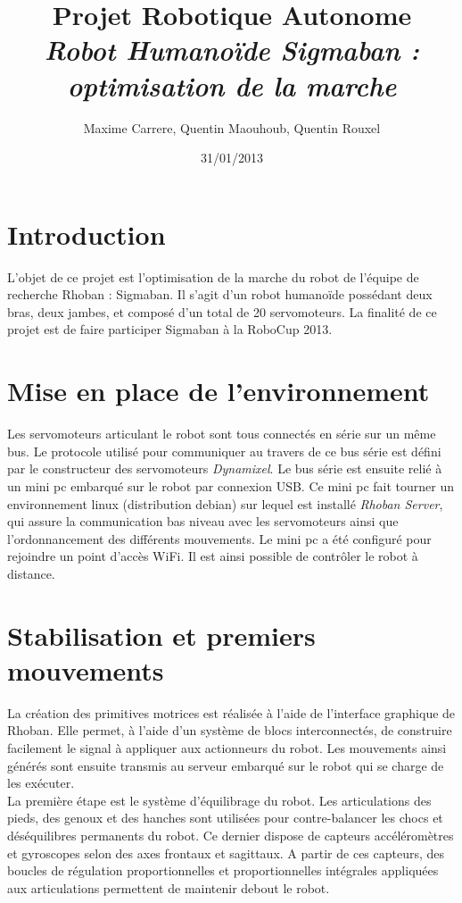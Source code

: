 \documentclass[11pt]{article}
\title{Projet Robotique Autonome\\
\textit{Robot Humanoïde Sigmaban : optimisation de la marche}}
\author{Maxime Carrere, Quentin Maouhoub, Quentin Rouxel}
\date{31/01/2013}
\begin{document}
\maketitle

\section{Introduction}

L'objet de ce projet est l'optimisation de la marche du robot de l'équipe 
de recherche Rhoban : Sigmaban. Il s'agit d'un robot humanoïde possédant deux bras,
deux jambes, et composé d'un total de 20 servomoteurs. La finalité de ce projet est de faire
participer Sigmaban à la RoboCup 2013.

\section{Mise en place de l'environnement}

Les servomoteurs articulant le robot sont tous connectés en série sur un même 
bus. Le protocole utilisé pour communiquer au travers de ce bus série est défini par le
constructeur des servomoteurs \textit{Dynamixel}. Le bus série est ensuite relié à un mini pc
embarqué sur le robot par connexion USB. Ce mini pc fait tourner un environnement linux
(distribution debian) sur lequel est installé \textit{Rhoban Server}, qui assure la communication
bas niveau avec les servomoteurs ainsi que l'ordonnancement des différents mouvements. Le mini pc
a été configuré pour rejoindre un point d'accès WiFi. Il est ainsi possible de contrôler le robot
à distance.

\section{Stabilisation et premiers mouvements}

La création des primitives motrices est réalisée à l'aide de l'interface graphique de Rhoban.
Elle permet, à l'aide d'un système de blocs interconnectés,
de construire facilement le signal à appliquer aux actionneurs du robot. Les mouvements ainsi générés
sont ensuite transmis au serveur embarqué sur le robot qui se charge de les exécuter.\\

La première étape est le système d'équilibrage du robot. Les articulations des pieds, des genoux 
et des hanches sont utilisées pour contre-balancer les chocs et déséquilibres permanents
du robot. Ce dernier dispose de capteurs accéléromètres et gyroscopes selon des axes frontaux et sagittaux.
A partir de ces capteurs, des boucles de régulation proportionnelles et proportionnelles intégrales appliquées
aux articulations permettent de maintenir debout le robot.\\
\end{document}
